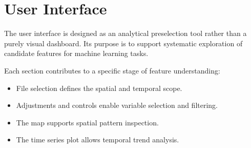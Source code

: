 
\section{User Interface}

The user interface is designed as an analytical preselection tool rather than a purely visual dashboard. Its purpose is to support systematic exploration of candidate features for machine learning tasks.

Each section contributes to a specific stage of feature understanding:

\begin{itemize}
    \item File selection defines the spatial and temporal scope.
    \item Adjustments and controls enable variable selection and filtering.
    \item The map supports spatial pattern inspection.
    \item The time series plot allows temporal trend analysis.
\end{itemize}